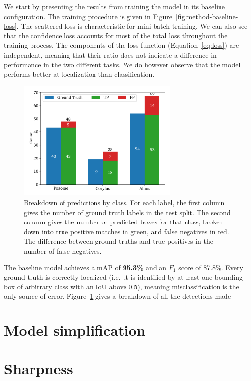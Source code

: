 We start by presenting the results from training the model in its baseline configuration. The training procedure is given in Figure~\ref{fig:method-baseline-loss}. The scattered loss is characteristic for mini-batch training. We can also see that the confidence loss accounts for most of the total loss throughout the training process. The components of the loss function (Equation~\ref{eq:loss}) are independent, meaning that their ratio does not indicate a difference in performance in the two different tasks. We do however observe that the model performs better at localization than classification.

\begin{figure}[htb]
    \centering
    \includegraphics[width=0.7\textwidth]{figs/method/baseline/detections_test.pdf}
    \caption[Detections by type by class for the baseline on the test split]{%
Breakdown of predictions by class. For each label, the first column gives the number of ground truth labels in the test split.
The second column gives the number or predicted boxes for that class, broken down into true positive matches in green, and false negatives in red.
The difference between ground truths and true positives in the number of false negatives. 
    }\label{fig:method-baseline-detections}
  \end{figure}

The baseline model achieves a mAP of \textbf{95.3\%} and an \(F_1\) score of 87.8\%.
Every ground truth is correctly localized (i.e.~it is identified by at least one bounding box of arbitrary class with an IoU above 0.5), meaning misclassification is the only source of error.
Figure~\ref{fig:method-baseline-detections} gives a breakdown of all the detections made



\section{Model simplification}\label{sec:results-simplification}

\section{Sharpness}\label{sec:results-sharpness}
